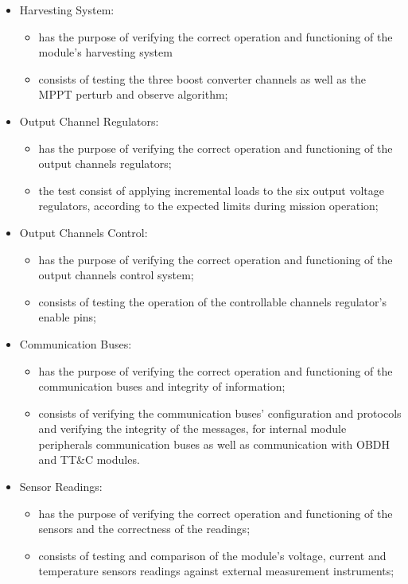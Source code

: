 \begin{itemize}
    \item Harvesting System:
    \begin{itemize}
        \item has the purpose of verifying the correct operation and functioning of the module's harvesting system
        \item consists of testing the three boost converter channels as well as the MPPT perturb and observe algorithm;
    \end{itemize}

    \item Output Channel Regulators:
    \begin{itemize}
        \item has the purpose of verifying the correct operation and functioning of the output channels regulators;
        \item the test consist of applying incremental loads to the six output voltage regulators, according to the expected limits during mission operation;
    \end{itemize}

    \item Output Channels Control:
    \begin{itemize}
        \item has the purpose of verifying the correct operation and functioning of the output channels control system;
        \item consists of testing the operation of the controllable channels regulator's enable pins;
    \end{itemize}

    \item Communication Buses:
    \begin{itemize}
        \item has the purpose of verifying the correct operation and functioning of the communication buses and integrity of information;
        \item consists of verifying the communication buses' configuration and protocols and verifying the integrity of the messages, for internal module peripherals communication buses as well as communication with OBDH and TT\&C modules.
    \end{itemize}

    \item Sensor Readings:
    \begin{itemize}
        \item has the purpose of verifying the correct operation and functioning of the sensors and the correctness of the readings;
        \item consists of testing and comparison of the module's voltage, current and temperature sensors readings against external measurement instruments;
    \end{itemize}


\end{itemize}
